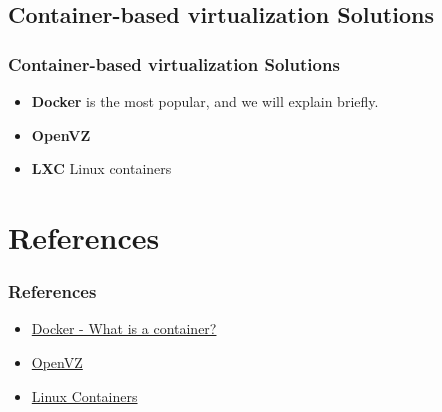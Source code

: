 \subsection{Container-based virtualization Solutions}
\begin{frame}
	\frametitle{Container-based virtualization Solutions}
	\begin{itemize}
		\item \textbf{Docker} is the most popular, and we will explain briefly.
		\item \textbf{OpenVZ}
		\item \textbf{LXC} Linux containers 
	\end{itemize}
\end{frame}

\section{References}
\begin{frame}
	\frametitle{References}
	\begin{itemize}
		\item \href{https://www.docker.com/resources/what-container}{Docker - What is a container?}
		\item \href{https://openvz.org/}{OpenVZ}
		\item \href{https://linuxcontainers.org/}{Linux Containers}
	\end{itemize}
\end{frame}
